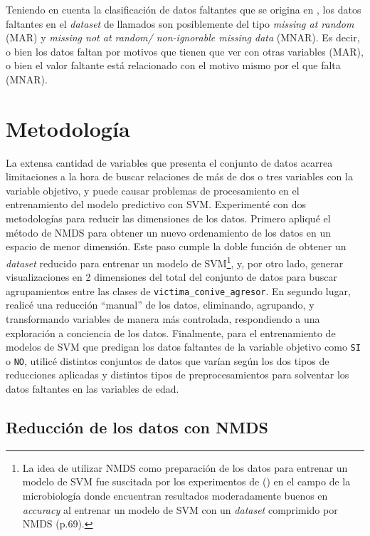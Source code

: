 \documentclass[10 pt]{article}
\begin{document}
Teniendo en cuenta la clasificación de datos faltantes que se origina en \citet{rubin1976inference}, los datos faltantes en el \textit{dataset} de llamados son posiblemente del tipo \textit{missing at random} (MAR) y \textit{missing not at random/ non-ignorable missing data} (MNAR). Es decir, o bien los datos faltan por motivos que tienen que ver con otras variables (MAR), o bien el valor faltante está relacionado con el motivo mismo por el que falta (MNAR).    


\section{Metodología}\label{met}

La extensa cantidad de variables que presenta el conjunto de datos acarrea limitaciones a la hora de buscar relaciones de más de dos o tres variables con la variable objetivo, y puede causar problemas de procesamiento en el entrenamiento del modelo predictivo con SVM. Experimenté con dos metodologías para reducir las dimensiones de los datos. Primero apliqué el método de NMDS para obtener un nuevo ordenamiento de los datos en un espacio de menor dimensión. Este paso cumple la doble función de obtener un \textit{dataset} reducido para entrenar un modelo de SVM\footnote{La idea de utilizar NMDS como preparación de los datos para entrenar un modelo de SVM fue suscitada por los experimentos de \citeauthor{cai2019incorporating}(\citeyear{cai2019incorporating}) en el campo de la microbiología donde encuentran resultados moderadamente buenos en \textit{accuracy} al entrenar un modelo de SVM con un \textit{dataset} comprimido por NMDS (p.69).}, y, por otro lado, generar visualizaciones en 2 dimensiones del total del conjunto de datos para buscar agrupamientos entre las clases de \texttt{victima\_conive\_agresor}. En segundo lugar, realicé una reducción “manual” de los datos, eliminando, agrupando, y transformando variables de manera más controlada, respondiendo a una exploración a conciencia de los datos. Finalmente, para el entrenamiento de modelos de SVM que predigan los datos faltantes de la variable objetivo como \texttt{SI} o \texttt{NO}, utilicé distintos conjuntos de datos que varían según los dos tipos de reducciones aplicadas y distintos tipos de preprocesamientos para solventar los datos faltantes en las variables de edad.


\subsection{Reducción de los datos con NMDS}
\end{document}

